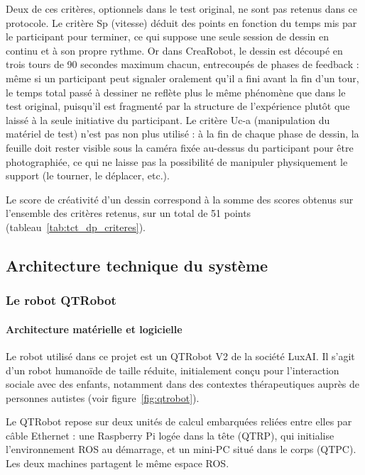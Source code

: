 \documentclass[11pt]{article}
\begin{document}
Deux de ces critères, optionnels dans le test original, ne sont pas retenus dans ce protocole. Le critère Sp (vitesse) déduit des points en fonction du temps mis par le participant pour terminer, ce qui suppose une seule session de dessin en continu et à son propre rythme. Or dans CreaRobot, le dessin est découpé en trois tours de 90 secondes maximum chacun, entrecoupés de phases de feedback : même si un participant peut signaler oralement qu'il a fini avant la fin d'un tour, le temps total passé à dessiner ne reflète plus le même phénomène que dans le test original, puisqu'il est fragmenté par la structure de l'expérience plutôt que laissé à la seule initiative du participant. Le critère Uc-a (manipulation du matériel de test) n'est pas non plus utilisé : à la fin de chaque phase de dessin, la feuille doit rester visible sous la caméra fixée au-dessus du participant pour être photographiée, ce qui ne laisse pas la possibilité de manipuler physiquement le support (le tourner, le déplacer, etc.).

Le score de créativité d'un dessin correspond à la somme des scores obtenus sur l'ensemble des critères retenus, sur un total de 51 points (tableau~\ref{tab:tct_dp_criteres}).

\newpage

\subsection{Architecture technique du système}

\subsubsection{Le robot QTRobot}
\label{sec:qtrobot}

\paragraph{Architecture matérielle et logicielle}

Le robot utilisé dans ce projet est un QTRobot V2 de la société LuxAI. Il s'agit d'un robot humanoïde de taille réduite, initialement conçu pour l'interaction sociale avec des enfants, notamment dans des contextes thérapeutiques auprès de personnes autistes (voir figure~\ref{fig:qtrobot}).

Le QTRobot repose sur deux unités de calcul embarquées reliées entre elles par câble Ethernet : une Raspberry Pi logée dans la tête (QTRP), qui initialise l'environnement ROS au démarrage, et un mini-PC situé dans le corps (QTPC). Les deux machines partagent le même espace ROS.
\end{document}
